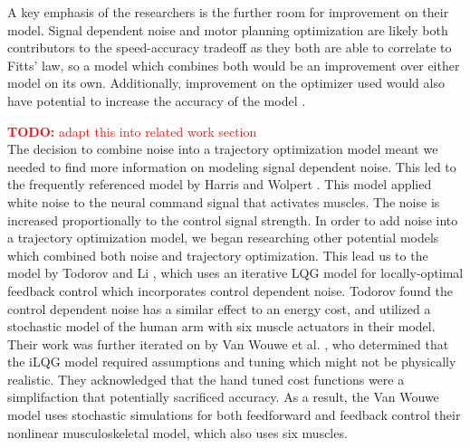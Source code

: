 \documentclass[letterpaper, 10pt, conference]{ieeeconf}
\newcommand{\todo}[1]{\textcolor{red}{\textbf{TODO:} #1}}
\begin{document}
A key emphasis of the researchers is the further room for improvement on their model. Signal dependent noise and motor planning optimization are likely both contributors to the speed-accuracy tradeoff as they both are able to correlate to Fitts’ law, so a model which combines both would be an improvement over either model on its own. Additionally, improvement on the optimizer used would also have potential to increase the accuracy of the model \cite{deep_rl}.


\todo{adapt this into related work section} \\
The decision to combine noise into a trajectory optimization model meant we needed to find more information on modeling signal dependent noise. This led to the frequently referenced model by Harris and Wolpert \cite{signal_dependent_motor_noise}. This model applied white noise to the neural command signal that activates muscles. The noise is increased proportionally to the control signal strength. In order to add noise into a trajectory optimization model, we began researching other potential models which combined both noise and trajectory optimization. This lead us to the model by Todorov and Li \cite{ilqg}, which uses an iterative LQG model for locally-optimal feedback control which incorporates control dependent noise. Todorov found the control dependent noise has a similar effect to an energy cost, and utilized a stochastic model of the human arm with six muscle actuators in their model. Their work was further iterated on by Van Wouwe et al. \cite{stochastic_model}, who determined that the iLQG model required assumptions and tuning which might not be physically realistic. They acknowledged that the hand tuned cost functions were a simplifaction that potentially sacrificed accuracy. As a result, the Van Wouwe model uses stochastic simulations for both feedforward and feedback control their nonlinear musculoskeletal model, which also uses six muscles. 
\end{document}
